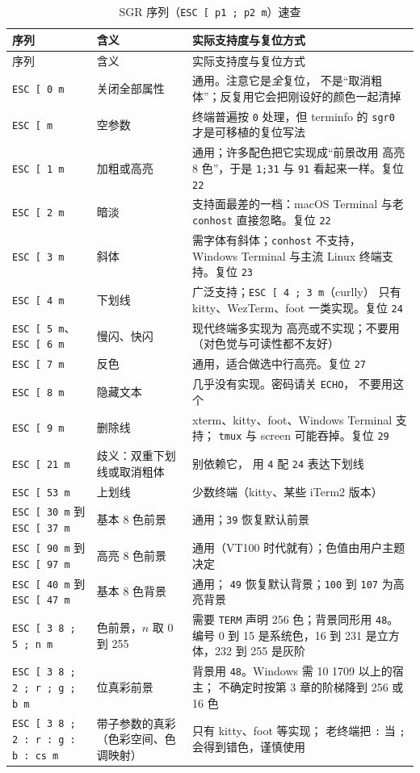 \documentclass[12pt,a4paper,fontset=fandol]{ctexbook}
\newcommand{\Tp}[1]{\texttt{#1}}
\begin{document}
\begin{longtable}{@{}>{\raggedright\arraybackslash}p{}
                 >{\raggedright\arraybackslash}p{}
                 >{\raggedright\arraybackslash}p{}@{}}
\caption{SGR 序列（\Tp{ESC [ p1 ; p2 m}）速查}
\label{tab:sgr} \\
\toprule
序列 & 含义 & 实际支持度与复位方式 \\
\midrule
\endfirsthead
\toprule
序列 & 含义 & 实际支持度与复位方式 \\
\midrule
\endhead
\Tp{ESC [ 0 m} & 关闭全部属性 & 通用。注意它是\emph{全}复位，
不是``取消粗体''；反复用它会把刚设好的颜色一起清掉 \\
\Tp{ESC [ m} & 空参数 & 终端普遍按 \Tp{0} 处理，但 terminfo 的
\Tp{sgr0} 才是可移植的复位写法 \\
\Tp{ESC [ 1 m} & 加粗或高亮 & 通用；许多配色把它实现成``前景改用
高亮 8 色''，于是 \Tp{1;31} 与 \Tp{91} 看起来一样。复位 \Tp{22} \\
\Tp{ESC [ 2 m} & 暗淡 & 支持面最差的一档：macOS Terminal 与老
\Tp{conhost} 直接忽略。复位 \Tp{22} \\
\Tp{ESC [ 3 m} & 斜体 & 需字体有斜体；\Tp{conhost} 不支持，
Windows Terminal 与主流 Linux 终端支持。复位 \Tp{23} \\
\Tp{ESC [ 4 m} & 下划线 & 广泛支持；\Tp{ESC [ 4 ; 3 m}（curlly）
只有 kitty、WezTerm、foot 一类实现。复位 \Tp{24} \\
\Tp{ESC [ 5 m}、\Tp{ESC [ 6 m} & 慢闪、快闪 & 现代终端多实现为
高亮或不实现；不要用（对色觉与可读性都不友好） \\
\Tp{ESC [ 7 m} & 反色 & 通用，适合做选中行高亮。复位 \Tp{27} \\
\Tp{ESC [ 8 m} & 隐藏文本 & 几乎没有实现。密码请关 \Tp{ECHO}，
不要用这个 \\
\Tp{ESC [ 9 m} & 删除线 & xterm、kitty、foot、Windows Terminal 支持；
\Tp{tmux} 与 screen 可能吞掉。复位 \Tp{29} \\
\Tp{ESC [ 21 m} & 歧义：双重下划线或取消粗体 & 别依赖它，
用 \Tp{4} 配 \Tp{24} 表达下划线 \\
\Tp{ESC [ 53 m} & 上划线 & 少数终端（kitty、某些 iTerm2 版本） \\
\Tp{ESC [ 30 m} 到 \Tp{ESC [ 37 m} & 基本 8 色前景 &
通用；\Tp{39} 恢复默认前景 \\
\Tp{ESC [ 90 m} 到 \Tp{ESC [ 97 m} & 高亮 8 色前景 &
通用（VT100 时代就有）；色值由用户主题决定 \\
\Tp{ESC [ 40 m} 到 \Tp{ESC [ 47 m} & 基本 8 色背景 & 通用；
\Tp{49} 恢复默认背景；\Tp{100} 到 \Tp{107} 为高亮背景 \\
\Tp{ESC [ 3 8 ; 5 ; n m} & 256 色前景，\(n\) 取 0 到 255 &
需要 \Tp{TERM} 声明 256 色；背景同形用 \Tp{48}。
编号 0 到 15 是系统色，16 到 231 是立方体，232 到 255 是灰阶 \\
\Tp{ESC [ 3 8 ; 2 ; r ; g ; b m} & 24 位真彩前景 &
背景用 \Tp{48}。Windows 需 10 1709 以上的宿主；
不确定时按第 3 章的阶梯降到 256 或 16 色 \\
\Tp{ESC [ 3 8 ; 2 : r : g : b : cs m} & 带子参数的真彩
（色彩空间、色调映射） & 只有 kitty、foot 等实现；
老终端把 \Tp{:} 当 \Tp{;} 会得到错色，谨慎使用 \\
\bottomrule
\end{longtable}
\end{document}
